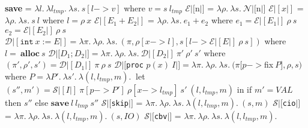 \documentclass[12pt]{minimal}
\begin{document}
\newline
%
%
\textbf{save} = $\lambda l.~\lambda l_{tmp}.~\lambda s.~s[l -> v]$\newline
\indent where $v = s~l_{tmp}$\newline
\newline
%
%
$\mathcal{E}|[$n$|]$ = $\lambda \rho.~\lambda s.~\mathcal{N}|[$n$|]$\newline
$\mathcal{E}|[x|]$ = $\lambda \rho.~\lambda s.~s~l$\newline
\indent where $l = \rho~x $\newline
$\mathcal{E}|[E_1 + E_2|]$ = $\lambda \rho.~\lambda s.~e_1 + e_2$ \newline
\indent where\newline
\indent\indent $e_1 = \mathcal{E}|[E_1|]~\rho~s$\newline
\indent\indent $e_2 = \mathcal{E}|[E_2|]~\rho~s$\newline
\newline
%
%
$\mathcal{D}|[\texttt{int}~x := E|] = \lambda \pi.~\lambda \rho.~\lambda s.~(\pi, \rho[x -> l], s[l -> \mathcal{E}|[E|]~\rho~s])$\newline
\indent where $l =~\textbf{alloc}~s$ \newline
$\mathcal{D}|[D_1;D_2|] = \lambda \pi.~\lambda \rho.~\lambda s.~\mathcal{D}|[D_2|]~\pi'~\rho'~s'$\newline
\indent where $(\pi', \rho', s') = \mathcal{D}|[D_1|]~\pi~\rho~s $\newline
$\mathcal{D}|[$\texttt{proc} $p(x)~I|] = \lambda \pi.~\lambda \rho.~\lambda s.~(\pi[p -> $fix$~P], \rho, s)$\newline
\indent where $P = \lambda P'.~\lambda s'.~\lambda (l, l_{tmp}, m).~$\newline
\indent let $(s'', m') = \mathcal{S}|[I|]~\pi[p -> P']~\rho[x -> l_{tmp}]~s'~(l, l_{tmp}, m)$ in\newline
\indent \indent if $m' = \textit{VAL}$ then $s''$\newline
\indent \indent else $\textbf{save}~l~l_{tmp}~s''$\newline
\newline
%
%
$\mathcal{S}|[$\texttt{skip}$|]$ = $\lambda \pi.~\lambda \rho.~\lambda s.~\lambda (l, l_{tmp}, m).~(s, m)$\newline
$\mathcal{S}|[$\texttt{cio}$|]$ = $\lambda \pi.~\lambda \rho.~\lambda s.~\lambda (l, l_{tmp}, m).~(s, \textit{IO})$\newline
$\mathcal{S}|[$\texttt{cbv}$|]$ = $\lambda \pi.~\lambda \rho.~\lambda s.~\lambda (l, l_{tmp}, m).$\newline
\end{document}
